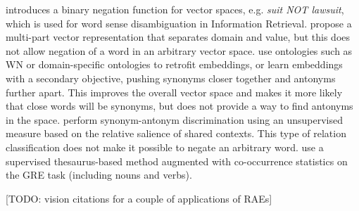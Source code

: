 \documentclass[11pt]{article}
\begin{document}
\citet{widdows:03} introduces a binary negation function for vector
spaces, e.g. {\it suit NOT lawsuit}, which is used for word sense
disambiguation in Information Retrieval. \citet{turney:12,hermann:13}
propose a multi-part vector representation that separates domain and
value, but this does not allow negation of a word in an arbitrary
vector space. \citet{pham:15,nguyen:16,mrksic:16} use ontologies such
as WN or domain-specific ontologies to retrofit embeddings, or learn
embeddings with a secondary objective, pushing synonyms closer
together and antonyms further apart. This improves the overall vector
space and makes it more likely that close words will be synonyms, but
does not provide a way to find antonyms in the
space. \citet{santus:14a,santus:14b,santus:15} perform synonym-antonym
discrimination using an unsupervised measure based on the relative
salience of shared contexts. This type of relation classification does
not make it possible to negate an arbitrary word. \citet{mohammad:13} use a supervised
thesaurus-based method augmented with co-occurrence statistics on the
GRE task (including nouns and verbs). 

[TODO: vision citations for a couple of applications of RAEs]

\end{document}
